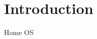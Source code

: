 \documentclass[letterpaper,12pt]{article}
\title{}
\author{}
\begin{document}
\maketitle

\section{Introduction}

Home OS~\cite{homeOS}



\end{document}

